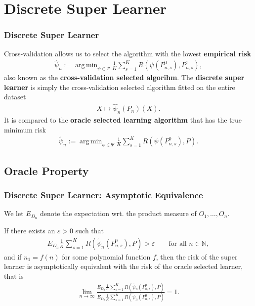 \documentclass{beamer}
\DeclareMathOperator*{\argmin}{arg\,min}
\newcommand{\la}{\psi}
\newcommand{\lib}{\Psi}
\begin{document}
\section{Discrete Super Learner}
\begin{frame}
\frametitle{Discrete Super Learner}
Cross-validation allows us to select the algorithm with the lowest \textbf{empirical risk
}
\begin{align*}
    \hat{\la}_n := \argmin_{\la \in \lib} \frac{1}{K} \sum_{s = 1}^{K} R(\la(P_{n, s}^{0}) , P_{n, s}^{1}),  
\end{align*}
also known as the \textbf{cross-validation selected algorihm}. The \textbf{discrete super learner} is simply the cross-validation selected algorithm fitted on the entire dataset 
\begin{align*}
    X \mapsto \hat{\la}_n(P_n)(X).
\end{align*}
It is compared to the \textbf{oracle selected learning algorithm} that has the true minimum risk
\begin{align*}
    \tilde{\la}_n := \argmin_{\la \in \lib} \frac{1}{K} \sum_{s = 1}^{K} R(\la(P_{n, s}^{0}) , P).  
\end{align*}
\end{frame}

\subsection{Oracle Property}
\begin{frame}
    \frametitle{Discrete Super Learner: Asymptotic Equivalence}
    We let $ E_{D_n} $ denote the expectation wrt. the product measure of $ O_1 , \dots , O_n $.   
\begin{theorem} \label{cor:dslasymptoticequivalence}
    If there exists an $ \varepsilon > 0 $ such that 
   \begin{align*}
       E_{D_n} \frac{1}{K} \sum_{s = 1}^{K} R(\tilde{\la}_n(P_{n, s}^{0}), P) > \varepsilon \qquad \text{for all } n \in \mathbb{N},
   \end{align*}
   and if $ n_1 = f(n) $ for some polynomial function $ f $, then the risk of the super learner is asymptotically equivalent with the risk of the oracle selected learner, that is
   \begin{align*}
       \lim_{n \to \infty} \frac{E_{D_n} \frac{1}{K} \sum_{s = 1}^{K} R(\hat{\la}_n(P_{n, s}^{0}), P)}{E_{D_n} \frac{1}{K} \sum_{s = 1}^{K} R(\tilde{\la}_n(P_{n, s}^{0}), P)} = 1.
   \end{align*}
\end{theorem}

\end{frame}
\end{document}
